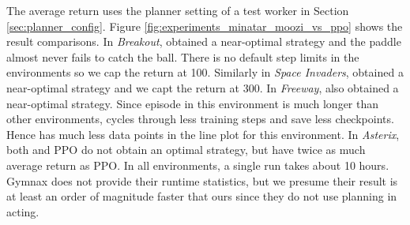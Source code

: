 The average return uses the planner setting of a test worker in Section \ref{sec:planner_config}.
Figure \ref{fig:experiments_minatar_moozi_vs_ppo} shows the result comparisons.
In \textit{Breakout}, \moozi obtained a near-optimal strategy and the paddle almost never fails to catch the ball.
There is no default step limits in the environments so we cap the return at 100.
Similarly in \textit{Space Invaders}, \moozi obtained a near-optimal strategy and we capt the return at 300.
In \textit{Freeway}, \moozi also obtained a near-optimal strategy.
Since episode in this environment is much longer than other environments, \moozi cycles through less training steps and save less checkpoints.
Hence \moozi has much less data points in the line plot for this environment.
In \textit{Asterix}, both \moozi and PPO do not obtain an optimal strategy, but \moozi have twice as much average return as PPO.
In all environments, a single run takes about 10 hours.
Gymnax does not provide their runtime statistics, but we presume their result is at least an order of magnitude faster that ours since they do not use planning in acting.



